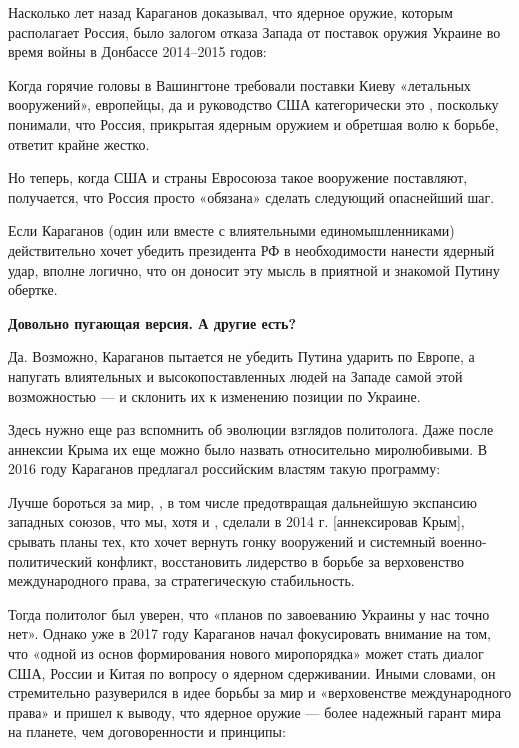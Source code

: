 Насколько лет назад Караганов доказывал, что ядерное оружие, которым располагает Россия, было залогом отказа Запада от поставок оружия Украине во время войны в Донбассе 2014–2015 годов:

\begin{fancyquotes}
    Когда горячие головы в Вашингтоне требовали поставки Киеву «летальных вооружений», европейцы, да и руководство США категорически это , поскольку понимали, что Россия, прикрытая ядерным оружием и обретшая волю к борьбе, ответит крайне жестко.
\end{fancyquotes}

Но теперь, когда США и страны Евросоюза такое вооружение поставляют, получается, что Россия просто «обязана» сделать следующий опаснейший шаг.

Если Караганов (один или вместе с влиятельными единомышленниками) действительно хочет убедить президента РФ в необходимости нанести ядерный удар, вполне логично, что он доносит эту мысль в приятной и знакомой Путину обертке.

\textbf{Довольно пугающая версия. А другие есть?}

Да. Возможно, Караганов пытается не убедить Путина ударить по Европе, а напугать влиятельных и высокопоставленных людей на Западе самой этой возможностью --- и склонить их к изменению позиции по Украине.

Здесь нужно еще раз вспомнить об эволюции взглядов политолога. Даже после аннексии Крыма их еще можно было назвать относительно миролюбивыми. В 2016 году Караганов предлагал российским властям такую программу:

\begin{fancyquotes}
    Лучше бороться за мир, , в том числе предотвращая дальнейшую экспансию западных союзов, что мы, хотя и , сделали в 2014 г. [аннексировав Крым], срывать планы тех, кто хочет вернуть гонку вооружений и системный военно-политический конфликт, восстановить лидерство в борьбе за верховенство международного права, за стратегическую стабильность.
\end{fancyquotes}

Тогда политолог был уверен, что «планов по завоеванию Украины у нас точно нет». Однако уже в 2017 году Караганов начал фокусировать внимание на том, что «одной из основ формирования нового миропорядка» может стать диалог США, России и Китая по вопросу о ядерном сдерживании. Иными словами, он стремительно разуверился в идее борьбы за мир и «верховенстве международного права» и пришел к выводу, что ядерное оружие — более надежный гарант мира на планете, чем договоренности и принципы:

